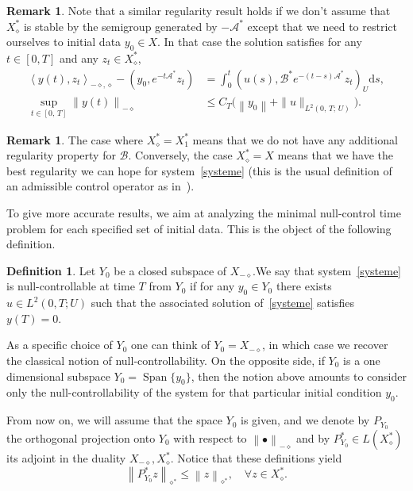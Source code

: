 \documentclass[10pt]{amsart}
\theoremstyle{definition}\newtheorem{defi}[theo]{Definition}\newtheorem{rema}[theo]{Remark}\newtheorem{exam}[theo]{Example}\newtheorem{exem}[theo]{Example}\newtheorem{nota}[theo]{Notation}
\newcommand\As{\mathcal{A}^*}
\newcommand\B{\mathcal{B}}
\newcommand\Bs{\mathcal{B}^*}
\newcommand{\Xuns}{X_1^*}
\newcommand{\Xalphas}{X_\diamond^*}
\newcommand{\Xmalpha}{X_{-\diamond}}
\newcommand{\Fzp}{Y_0}
\newcommand{\normeX}[1]{\left\| #1 \right\|}
\newcommand{\normeXalphas}[1]{\left\| #1 \right\|_{\diamond^*}}
\newcommand{\normeXmalpha}[1]{\left\| #1 \right\|_{-\diamond}}
\newcommand{\psX}[2]{\left(#1, #2 \right)}
\newcommand{\psU}[2]{\left(#1, #2 \right)_U}
\newcommand{\dual}[2]{\left\langle #1, #2 \right\rangle_{-\diamond,\diamond}}
\newcommand{\PF}{P_{\Fzp}}
\newcommand{\PFa}{P_{\Fzp}^*}
\newcommand{\md}{\mathrm{d}}
\DeclareMathOperator{\Span}{Span}
\renewcommand{\cdot}{{\scriptstyle \bullet}}
\let\oldforall\forall
\renewcommand*{\forall}{\mathrel{\oldforall}}
\begin{document}
\begin{rema}\label{Rem:Xdiamond_stable}
Note that a similar regularity result holds if we don't assume that $\Xalphas$ is stable by the semigroup generated by $-\As$ except that we need to restrict ourselves to initial data $y_0\in X$. In that case the solution satisfies for any $t \in [0,T]$ and any $z_t \in \Xalphas$,
\begin{align*}
\dual{y(t)}{z_t} - \psX{y_0}{e^{-t\As} z_t} &= \int_0^t \psU{u(s)}{ \Bs e^{-(t-s) \As} z_t} \md s,\\
\sup\limits_{t \in [0,\,T]} \normeXmalpha{y(t)} &\leq C_T \big(\normeX{y_0} + \| u \|_{L^2(0,\,T;\,U)} \big).
\end{align*}
\end{rema}

\begin{rema}
The case where $\Xalphas=\Xuns$ means that we do not have any additional regularity property for $\B$. Conversely, the case $\Xalphas=X$ means that we have the best regularity we can hope for system~\eqref{systeme} (this is the usual definition of an admissible control operator as in~\cite{CoronBook,TucsnakWeissBook}).
\end{rema}


To give more accurate results, we aim at analyzing the minimal null-control time problem for each specified set of initial data. This is the object of the following definition.

\begin{defi}
Let $\Fzp$ be a closed subspace of $\Xmalpha$.We say that system~\eqref{systeme} is null-controllable at time $T$ from $\Fzp$ if for any $y_0 \in \Fzp$ there exists $u \in L^2(0,T ; U)$ such that the associated solution of~\eqref{systeme} satisfies $y(T) = 0$.
\end{defi}

As a specific choice of $\Fzp$ one can think of $\Fzp = \Xmalpha$, in which case we recover the classical notion of null-controllability. On the opposite side, if $\Fzp$ is a one dimensional subspace $\Fzp = \Span\{ y_0 \}$, then the notion above amounts to consider only the null-controllability of the system for that particular initial condition $y_0$.


From now on, we will assume that the space $\Fzp$ is given, and we denote by $\PF$ the orthogonal projection onto $\Fzp$ with respect to $\normeXmalpha{\cdot}$ and by $\PFa\in L(\Xalphas)$ its adjoint in the duality $\Xmalpha, \Xalphas$. Notice that these definitions yield
\begin{equation}\label{PFa_norme_un}
\normeXalphas{\PFa z} \leq \normeXalphas{z}, \quad \forall z \in \Xalphas.
\end{equation}
\end{document}

